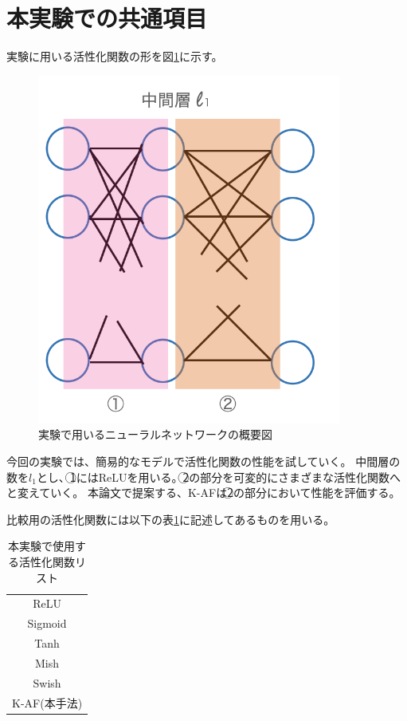 \section{本実験での共通項目}
\label{exp_common}

実験に用いる活性化関数の形を図\ref{k-af-net}に示す。
\begin{figure}[hbtp]
    \begin{center}
        \includegraphics[width=10cm]{asset/k-af-net.png}
            \caption{実験で用いるニューラルネットワークの概要図}
            \label{k-af-net}
    \end{center}
\end{figure}

今回の実験では、簡易的なモデルで活性化関数の性能を試していく。
中間層の数を$ l_1 $とし、\textcircled{\scriptsize 1}にはReLUを用いる。\textcircled{\scriptsize 2}の部分を可変的にさまざまな活性化関数へと変えていく。
本論文で提案する、K-AFは\textcircled{\scriptsize 2}の部分において性能を評価する。

比較用の活性化関数には以下の表\ref{list:af_table}に記述してあるものを用いる。


\begin{table}[htbp]
    \begin{center}
        \caption{本実験で使用する活性化関数リスト}
        \label{list:af_table}
        \vspace{2mm} 
        \begin{tabular}{ |c| }
        \hline
        ReLU \\
        Sigmoid \\
        Tanh   \\
        Mish  \\
        Swish  \\
        K-AF(本手法)   \\
        \hline
        \end{tabular}
    \end{center}
\end{table}



